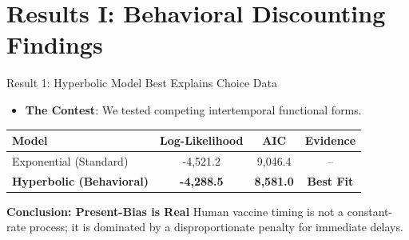 \documentclass[10pt]{beamer}
\begin{document}
\section{Results I: Behavioral Discounting Findings}

\begin{frame}{Result 1: Hyperbolic Model Best Explains Choice Data}
    \begin{itemize}
        \item \textbf{The Contest}: We tested competing intertemporal functional forms.
    \end{itemize}
    \begin{table}[]
        \centering \small
        \begin{tabular}{lccc}
            \hline
            \textbf{Model} & \textbf{Log-Likelihood} & \textbf{AIC} & \textbf{Evidence} \\
            \hline
            Exponential (Standard) & -4,521.2 & 9,046.4 & -- \\
            \textbf{Hyperbolic (Behavioral)} & \textbf{-4,288.5} & \textbf{8,581.0} & \alert{\textbf{Best Fit}} \\
            \hline
        \end{tabular}
    \end{table}
    \vfill
    \begin{exampleblock}{\centering \textbf{Conclusion: Present-Bias is Real}}
        \centering \small Human vaccine timing is not a constant-rate process; it is dominated by a \alert{disproportionate penalty for immediate delays}.
    \end{exampleblock}
\end{frame}
\end{document}
